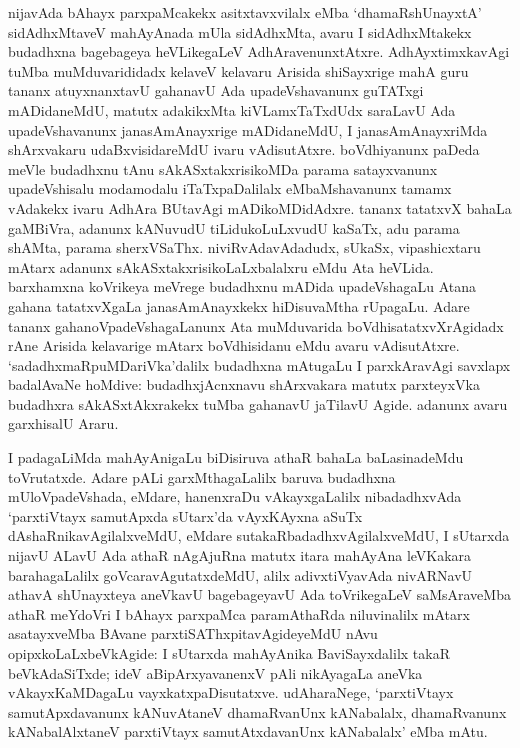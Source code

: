 nijavAda bAhayx parxpaMcakekx asitxtavxvilalx eMba `dhamaRshUnayxtA' sidAdhxMtaveV mahAyAnada mUla sidAdhxMta, avaru I sidAdhxMtakekx budadhxna bagebageya heVLikegaLeV AdhAravenunxtAtxre. AdhAyxtimxkavAgi tuMba muMduvarididadx kelaveV kelavaru Arisida shiSayxrige mahA guru tananx atuyxnanxtavU gahanavU Ada upadeVshavanunx guTATxgi mADidaneMdU, matutx adakikxMta kiVLamxTaTxdUdx saraLavU Ada upadeVshavanunx janasAmAnayxrige mADidaneMdU, I janasAmAnayxriMda shArxvakaru udaBxvisidareMdU ivaru vAdisutAtxre. boVdhiyanunx paDeda meVle budadhxnu tAnu sAkASxtakxrisikoMDa parama satayxvanunx upadeVshisalu modamodalu iTaTxpaDalilalx eMbaMshavanunx tamamx vAdakekx ivaru AdhAra BUtavAgi mADikoMDidAdxre. tananx tatatxvX bahaLa gaMBiVra, adanunx kANuvudU tiLidukoLuLxvudU kaSaTx, adu parama shAMta, parama sherxVSaThx. niviRvAdavAdadudx, sUkaSx, vipashicxtaru mAtarx adanunx sAkASxtakxrisikoLaLxbalalxru eMdu Ata heVLida. barxhamxna koVrikeya meVrege budadhxnu mADida upadeVshagaLu Atana gahana tatatxvXgaLa janasAmAnayxkekx hiDisuvaMtha rUpagaLu. Adare tananx gahanoVpadeVshagaLanunx Ata muMduvarida boVdhisatatxvXrAgidadx rAne Arisida kelavarige mAtarx boVdhisidanu eMdu avaru vAdisutAtxre. `sadadhxmaRpuMDariVka'dalilx budadhxna mAtugaLu I parxkAravAgi savxlapx badalAvaNe hoMdive: budadhxjAcnxnavu shArxvakara matutx parxteyxVka budadhxra sAkASxtAkxrakekx tuMba gahanavU jaTilavU Agide. adanunx avaru garxhisalU Araru.

I padagaLiMda mahAyAnigaLu biDisiruva athaR bahaLa baLasinadeMdu toVrutatxde. Adare pALi garxMthagaLalilx baruva budadhxna mUloVpadeVshada, eMdare, hanenxraDu vAkayxgaLalilx nibadadhxvAda `parxtiVtayx samutApxda sUtarx'da vAyxKAyxna aSuTx dAshaRnikavAgilalxveMdU, eMdare sutakaRbadadhxvAgilalxveMdU, I sUtarxda nijavU ALavU Ada athaR nAgAjuRna matutx itara mahAyAna leVKakara barahagaLalilx goVcaravAgutatxdeMdU, alilx adivxtiVyavAda nivARNavU athavA shUnayxteya aneVkavU bagebageyavU Ada toVrikegaLeV saMsAraveMba athaR meYdoVri I bAhayx parxpaMca paramAthaRda niluvinalilx mAtarx asatayxveMba BAvane parxtiSAThxpitavAgideyeMdU nAvu opipxkoLaLxbeVkAgide: I sUtarxda mahAyAnika BaviSayxdalilx takaR beVkAdaSiTxde; ideV aBipArxyavanenxV pAli nikAyagaLa aneVka vAkayxKaMDagaLu vayxkatxpaDisutatxve. udAharaNege, `parxtiVtayx samutApxdavanunx kANuvAtaneV  dhamaRvanUnx kANabalalx, dhamaRvanunx kANabalAlxtaneV parxtiVtayx samutAtxdavanUnx kANabalalx' eMba mAtu.

